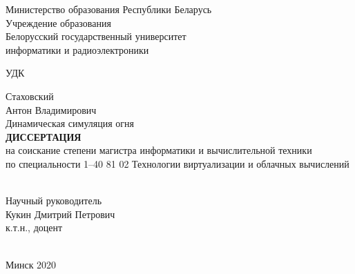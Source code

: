 \begin{titlepage}
    \begin{center}
        Министерство образования Республики Беларусь \\
        Учреждение образования \\
        Белорусский государственный университет \\
        информатики и радиоэлектроники \\[4em]
    \end{center}

    \begin{raggedright}
        \begin{minipage}{4cm}
            УДК\hrulefill{} \\[1em]
        \end{minipage}
    \end{raggedright}

    \begin{center}
        Стаховский \\
        Антон Владимирович \\[6em]

        Динамическая симуляция огня \\[3em]

        \MakeUppercase{\textbf{Диссертация}} \\
        на соискание степени магистра информатики и вычислительной техники \\
        по специальности 1--40 81 02 Технологии виртуализации и облачных вычислений \\ [4em]
    \end{center}

    \hfill
    \begin{raggedleft}
        \begin{minipage}{7cm}
            \hrulefill{} \\[1em]
            Научный руководитель \\[1em]
            Кукин Дмитрий Петрович \\[1em]
            к.т.н., доцент \\[1em]
            \null\hrulefill{} \\[1em]
        \end{minipage}
    \end{raggedleft}

    \vfill
    \begin{center}
        Минск 2020
    \end{center}
\end{titlepage}
